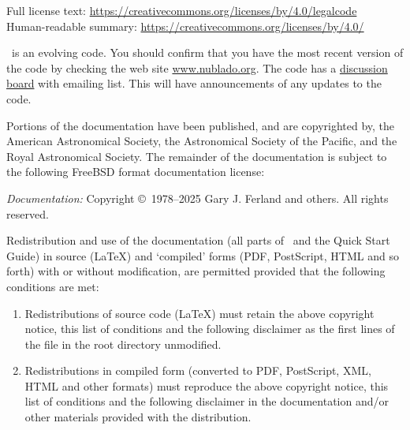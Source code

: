{\vspace{1em}
Full license text: \url{https://creativecommons.org/licenses/by/4.0/legalcode} \\
Human-readable summary: \url{https://creativecommons.org/licenses/by/4.0/}



\vspace{1em}

\noindent
\Cloudy\ is an evolving code.
You should confirm that you have the most recent
version of the code by checking the web site
\href{http://www.nublado.org}{www.nublado.org}.
The code has a
\href{https://cloudyastrophysics.groups.io}{discussion board} with emailing list.
This will have announcements of any updates to the code.\par

\vspace{1em}

\noindent
Portions of the documentation have been published, and are copyrighted by, the
American Astronomical Society, the Astronomical Society of the Pacific, and
the Royal Astronomical Society. The remainder of the documentation is subject
to the following FreeBSD format documentation license:

\vspace{1em}

\noindent

{\em Documentation:} Copyright \copyright\ 1978--2025 Gary J. Ferland and others. All rights reserved.

\vspace{1em}

\noindent
Redistribution and use of the documentation (all parts of \Hazy\ and the
Quick Start Guide) in source (\LaTeX) and `compiled' forms (PDF, PostScript,
HTML and so forth) with or without modification, are permitted provided that
the following conditions are met:

\begin{enumerate}
\item
Redistributions of source code (\LaTeX) must retain the above copyright notice,
this list of conditions and the following disclaimer as the first lines of
the file  in the root directory unmodified.
\item
Redistributions in compiled form (converted to PDF, PostScript, XML, HTML and
other formats) must reproduce the above copyright notice, this list of
conditions and the following disclaimer in the documentation and/or other
materials provided with the distribution.
\end{enumerate}

}
